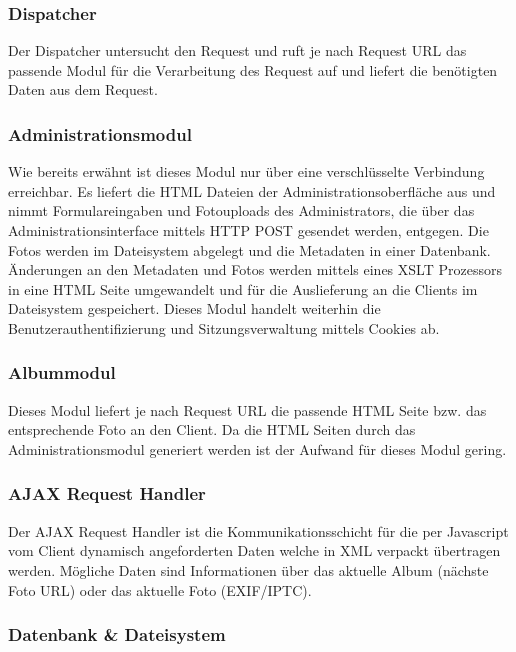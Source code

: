 \documentclass[a4paper,12pt,liststotocnumbered]{scrartcl}
\begin{document}
\subsubsection{Dispatcher}

Der Dispatcher untersucht den Request und ruft je nach Request URL das
passende Modul für die Verarbeitung des Request auf und liefert die benötigten
Daten aus dem Request.

\subsubsection{Administrationsmodul}

Wie bereits erwähnt ist dieses Modul nur über eine verschlüsselte Verbindung
erreichbar. Es liefert die HTML Dateien der Administrationsoberfläche aus und
nimmt Formulareingaben und Fotouploads des Administrators, die über das
Administrationsinterface mittels HTTP POST gesendet werden, entgegen. Die
Fotos werden im Dateisystem abgelegt und die Metadaten in einer Datenbank.
Änderungen an den Metadaten und Fotos werden mittels eines XSLT Prozessors
in eine HTML Seite umgewandelt und für die Auslieferung an die Clients im
Dateisystem gespeichert. Dieses Modul handelt weiterhin die
Benutzerauthentifizierung und Sitzungsverwaltung mittels Cookies ab.

\subsubsection{Albummodul}

Dieses Modul liefert je nach Request URL die passende HTML Seite bzw. das
entsprechende Foto an den Client. Da die HTML Seiten durch das
Administrationsmodul generiert werden ist der Aufwand für dieses Modul gering.

\subsubsection{AJAX Request Handler}

Der AJAX Request Handler ist die Kommunikationsschicht für die per Javascript
vom Client dynamisch angeforderten Daten welche in XML verpackt übertragen
werden. Mögliche Daten sind Informationen über das aktuelle Album (nächste
Foto URL) oder das aktuelle Foto (EXIF/IPTC).

\subsubsection{Datenbank \& Dateisystem}
\end{document}

